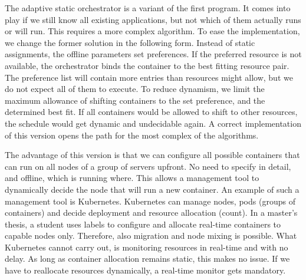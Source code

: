 \documentclass[]{scrartcl}
\begin{document}
The adaptive static orchestrator is a variant of the first program.
It comes into play if we still know all existing applications, but not which of them actually runs or will run. 
This requires a more complex algorithm.
To ease the implementation, we change the former solution in the following form.
Instead of static assignments, the offline parameters set preferences. 
If the preferred resource is not available, the orchestrator binds the container to the best fitting resource pair.
The preference list will contain more entries than resources might allow, but we do not expect all of them to execute.
To reduce dynamism, we limit the maximum allowance of shifting containers to the set preference, and the determined best fit.
If all containers would be allowed to shift to other resources, the schedule would get dynamic and undecidable again.
A correct implementation of this version opens the path for the most complex of the algorithms.

The advantage of this version is that we can configure all possible containers that can run on all nodes of a group of servers upfront.
No need to specify in detail, and offline, which is running where.
This allows a management tool to dynamically decide the node that will run a new container.
An example of such a management tool is Kubernetes. 
Kubernetes can manage nodes, pods (groups of containers) and decide deployment and resource allocation (count).
In a master's thesis, a student uses labels to configure and allocate real-time containers to capable nodes only.
Therefore, also migration and node mixing is possible.
What Kubernetes cannot carry out, is monitoring resources in real-time and with no delay.
As long as container allocation remains static, this makes no issue. 
If we have to reallocate resources dynamically, a real-time monitor gets mandatory.
\end{document}
